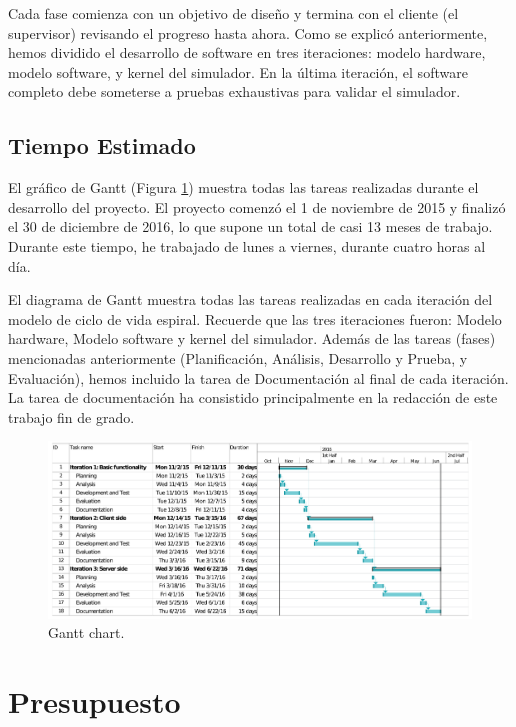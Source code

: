 Cada fase comienza con un objetivo de diseño y termina con el cliente (el supervisor) revisando el progreso hasta ahora. Como se explicó anteriormente, hemos dividido el desarrollo de software en tres iteraciones: modelo hardware, modelo software, y kernel del simulador. En la última iteración, el software completo debe someterse a pruebas exhaustivas para validar el simulador.

\subsection{Tiempo Estimado}

El gráfico de Gantt (Figura \ref{fig:gantt}) muestra todas las tareas realizadas durante el desarrollo del proyecto. El proyecto comenzó el 1 de noviembre de 2015 y finalizó el 30 de diciembre de 2016, lo que supone un total de casi 13 meses de trabajo. Durante este tiempo, he trabajado de lunes a viernes, durante cuatro horas al día.

El diagrama de Gantt muestra todas las tareas realizadas en cada iteración del modelo de ciclo de vida espiral. Recuerde que las tres iteraciones fueron: Modelo hardware, Modelo software y kernel del simulador. Además de las tareas (fases) mencionadas anteriormente (Planificación, Análisis, Desarrollo y Prueba, y Evaluación), hemos incluido la tarea de Documentación al final de cada iteración. La tarea de documentación ha consistido principalmente en la redacción de este trabajo fin de grado.

\begin{figure}[htbp]
 	\centering
 	\includegraphics[width=16.5cm]{figures/gantt}
 	\caption{Gantt chart.}
	\label{fig:gantt}
\end{figure}

\section{Presupuesto}
\label{sec:budget}

